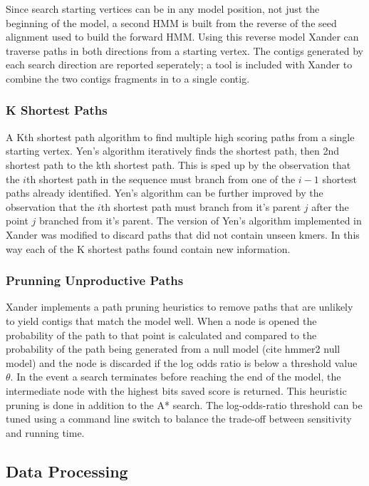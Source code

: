 \documentclass[10pt]{bmc_article}
\newenvironment{bmcformat}{\begin{raggedright}\baselineskip20pt\sloppy\setboolean{publ}{false}}{\end{raggedright}\baselineskip20pt\sloppy}
\begin{document}
\begin{bmcformat}
Since search starting vertices can be in any model position, not just the beginning of the model, a second HMM is built from the reverse of the seed alignment used to build the forward HMM.  Using this reverse model Xander can traverse paths in both directions from a starting vertex.  The contigs generated by each search direction are reported seperately; a tool is included with Xander to combine the two contigs fragments in to a single contig.

\subsubsection*{K Shortest Paths}
A Kth shortest path algorithm\cite{yen_finding_1971} to find multiple high scoring paths from a single starting vertex.  Yen's algorithm iteratively finds the shortest path, then 2nd shortest path to the kth shortest path.  This is sped up by the observation that the $i$th shortest path in the sequence must branch from one of the $i-1$ shortest paths already identified.  Yen's algorithm can be further improved by the observation that the $i$th shortest path must branch from it's parent $j$ after the point $j$ branched from it's parent\cite{lawler_procedure_1972}.  The version of Yen's algorithm implemented in Xander was modified to discard paths that did not contain unseen kmers.  In this way each of the K shortest paths found contain new information.

\subsubsection*{Prunning Unproductive Paths}
Xander implements a path pruning heuristics to remove paths that are unlikely to yield contigs that match the model well.  When a node is opened the probability of the path to that point is calculated and compared to the probability of the path being generated from a null model (cite hmmer2 null model) and the node is discarded if the log odds ratio is below a threshold value $\theta$. In the event a search terminates before reaching the end of the model, the intermediate node with the highest bits saved score is returned.  This heuristic pruning is done in addition to the A* search. The log-odds-ratio threshold can be tuned using a command line switch to balance the trade-off between sensitivity and running time.

\subsection*{Data Processing}

\end{bmcformat}
\end{document}
